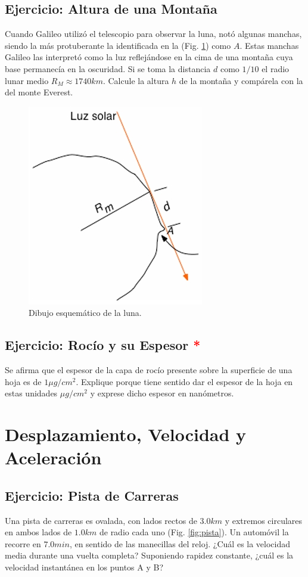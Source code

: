 \documentclass{replab}
\begin{document}
	\subsection{Ejercicio: Altura de una Montaña}
	Cuando Galileo utilizó el telescopio para observar la luna, notó algunas manchas, siendo la más protuberante la identificada en la (Fig. \ref{fig:montana}) como $A$. Estas manchas Galileo las interpretó como la luz reflejándose en la cima de una montaña cuya base permanecía en la oscuridad. Si se toma la distancia $d$ como $1/10$ el radio lunar medio $R_M \approx 1740km$. Calcule la altura $h$ de la montaña y compárela con la del monte Everest.

	\begin{figure}[htbp]
		\centering
		\includegraphics[width=.3\columnwidth]{imagenes/luna.jpeg}
		\caption{Dibujo esquemático de la luna.}
		\label{fig:montana}
	\end{figure}

	\subsection{Ejercicio: Rocío y su Espesor \textcolor{red}{*}}
	Se afirma que el espesor de la capa de rocío presente sobre la superficie de una hoja es de $1\mu g/cm^2$. Explique porque tiene sentido dar el espesor de la hoja en estas unidades $\mu g/cm^2$ y exprese dicho espesor en nanómetros. 

	\section{Desplazamiento, Velocidad y Aceleración}

	\subsection{Ejercicio: Pista de Carreras}
	Una pista de carreras es ovalada, con lados rectos de $3.0km$ y extremos circulares en ambos lados de $1.0km$ de radio cada uno (Fig. \ref{fig:pista}). Un automóvil la recorre en $7.0min$, en sentido de las manecillas del reloj. ¿Cuál es la velocidad media durante una vuelta completa? Suponiendo rapidez constante, ¿cuál es la velocidad instantánea en los puntos A y B? 
\end{document}
